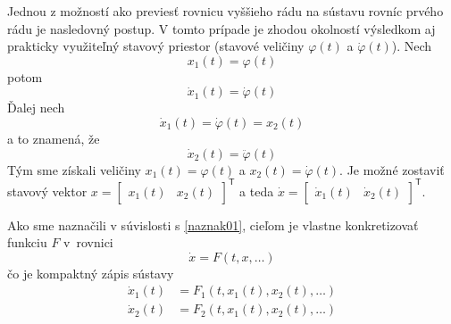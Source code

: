 \documentclass[a4paper, 10pt, ]{article}
\begin{document}
Jednou z možností ako previesť rovnicu vyššieho rádu na sústavu rovníc prvého rádu je nasledovný postup. V tomto prípade je zhodou okolností výsledkom aj prakticky využiteľný stavový priestor (stavové veličiny $\varphi(t)$ a $\dot \varphi(t)$). Nech
\begin{equation}
    x_1(t) = \varphi(t)
\end{equation}
potom
\begin{equation}
    \dot x_1(t) = \dot \varphi(t)
\end{equation}
Ďalej nech
\begin{equation}
    \dot x_1(t) = \dot \varphi(t) = x_2(t)
\end{equation}
a to znamená, že
\begin{equation}
    \dot x_2(t) = \ddot \varphi(t)
\end{equation}
Tým sme získali veličiny $x_1(t) = \varphi(t)$ a $x_2(t) = \dot \varphi(t)$. Je možné zostaviť stavový vektor $x = \begin{bmatrix} x_1(t) & x_2(t) \end{bmatrix}^\mathsf T$ a teda $\dot x = \begin{bmatrix} \dot x_1(t) & \dot x_2(t) \end{bmatrix}^\mathsf T$.

Ako sme naznačili v súvislosti s \eqref{naznak01}, cieľom je vlastne konkretizovať funkciu $F$ v~rovnici
\begin{equation}
    \dot x = F(t, x, \ldots)
\end{equation}
čo je kompaktný zápis sústavy
\begin{align}
    \dot x_1(t) &= F_1 \left(t, x_1(t), x_2(t), \ldots \right) \\
    \dot x_2(t) &= F_2 \left(t, x_1(t), x_2(t), \ldots \right)
\end{align}
\end{document}
